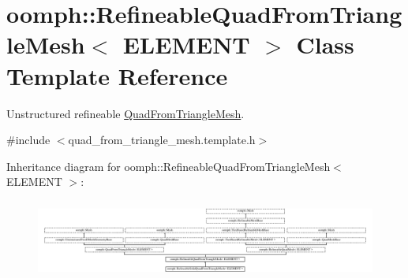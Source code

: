 \hypertarget{classoomph_1_1RefineableQuadFromTriangleMesh}{}\section{oomph\+:\+:Refineable\+Quad\+From\+Triangle\+Mesh$<$ E\+L\+E\+M\+E\+NT $>$ Class Template Reference}
\label{classoomph_1_1RefineableQuadFromTriangleMesh}


Unstructured refineable \hyperlink{classoomph_1_1QuadFromTriangleMesh}{Quad\+From\+Triangle\+Mesh}.  




{\ttfamily \#include $<$quad\+\_\+from\+\_\+triangle\+\_\+mesh.\+template.\+h$>$}

Inheritance diagram for oomph\+:\+:Refineable\+Quad\+From\+Triangle\+Mesh$<$ E\+L\+E\+M\+E\+NT $>$\+:\begin{figure}[H]
\begin{center}
\leavevmode
\includegraphics[height=2.648649cm]{classoomph_1_1RefineableQuadFromTriangleMesh}
\end{center}
\end{figure}
